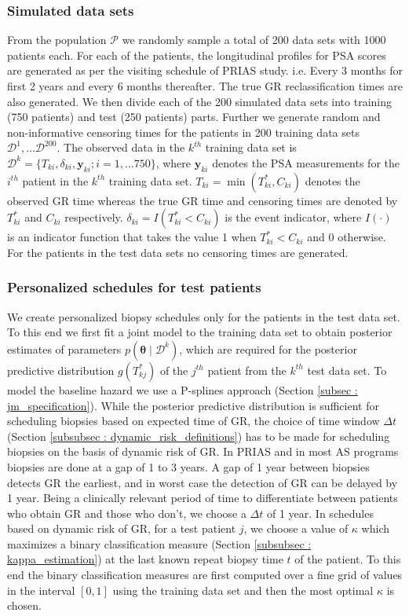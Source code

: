 \subsubsection{Simulated data sets}
From the population $\mathcal{P}$ we randomly sample a total of 200 data sets with 1000 patients each. For each of the patients, the longitudinal profiles for PSA scores are generated as per the visiting schedule of PRIAS study. i.e. Every 3 months for first 2 years and every 6 months thereafter. The true GR reclassification times are also generated. We then divide each of the 200 simulated data sets into training (750 patients) and test (250 patients) parts. Further we generate random and non-informative censoring times for the patients in 200 training data sets $\mathcal{D}^1, \ldots \mathcal{D}^{200}$. The observed data in the $k^{th}$ training data set is $\mathcal{D}^k = \{T_{ki}, \delta_{ki}, \boldsymbol{y}_{ki}; i = 1,\ldots 750\}$, where $\boldsymbol{y}_{ki}$ denotes the PSA measurements for the $i^{th}$ patient in the $k^{th}$ training data set. $T_{ki} = \min(T^*_{ki}, C_{ki})$ denotes the observed GR time whereas the true GR time and censoring times are denoted by $T^*_{ki}$ and $C_{ki}$ respectively. $\delta_{ki} = I(T^*_{ki} < C_{ki})$ is the event indicator, where $I(\cdot)$ is an indicator function that takes the value 1 when $T^*_{ki} < C_{ki}$ and 0 otherwise. For the patients in the test data sets no censoring times are generated.

\subsubsection{Personalized schedules for test patients}
\label{subsubsec : sim_study_pers_sched_details}
We create personalized biopsy schedules only for the patients in the test data set. To this end we first fit a joint model to the training data set to obtain posterior estimates of parameters $p(\boldsymbol{\theta} \mid \mathcal{D}^k)$, which are required for the posterior predictive distribution $g(T^*_{kj})$ of the $j^{th}$ patient from the $k^{th}$ test data set. To model the baseline hazard we use a P-splines approach (Section \ref{subsec : jm_specification}). While the posterior predictive distribution is sufficient for scheduling biopsies based on expected time of GR, the choice of time window $\Delta t$ (Section \ref{subsubsec : dynamic_risk_definitions}) has to be made for scheduling biopsies on the basis of dynamic risk of GR. In PRIAS and in most AS programs biopsies are done at a gap of 1 to 3 years. A gap of 1 year between biopsies detects GR the earliest, and in worst case the detection of GR can be delayed by 1 year. Being a clinically relevant period of time to differentiate between patients who obtain GR and those who don't, we choose a $\Delta t$ of 1 year. In schedules based on dynamic risk of GR, for a test patient $j$, we choose a value of $\kappa$ which maximizes a binary classification measure (Section \ref{subsubsec : kappa_estimation}) at the last known repeat biopsy time $t$ of the patient. To this end the binary classification measures are first computed over a fine grid of values in the interval $[0,1]$ using the training data set and then the most optimal $\kappa$ is chosen.\\

